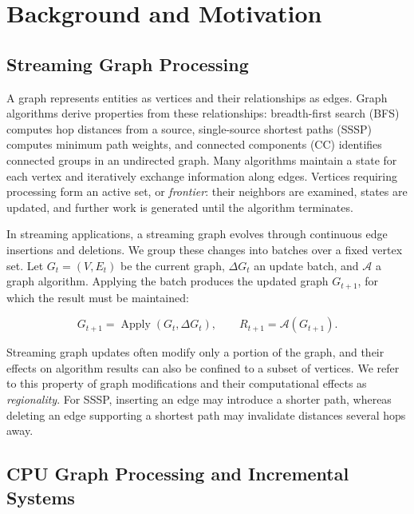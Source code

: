 \section{Background and Motivation}

\subsection{Streaming Graph Processing}

A graph represents entities as vertices and their relationships as edges. Graph algorithms derive properties from these relationships: breadth-first search (BFS) computes hop distances from a source, single-source shortest paths (SSSP) computes minimum path weights, and connected components (CC) identifies connected groups in an undirected graph. Many algorithms maintain a state for each vertex and iteratively exchange information along edges. Vertices requiring processing form an active set, or \emph{frontier}: their neighbors are examined, states are updated, and further work is generated until the algorithm terminates.

In streaming applications, a streaming graph evolves through continuous edge insertions and deletions. We group these changes into batches over a fixed vertex set. Let $G_t=(V,E_t)$ be the current graph, $\Delta G_t$ an update batch, and $\mathcal A$ a graph algorithm. Applying the batch produces the updated graph $G_{t+1}$, for which the result must be maintained:

\[
G_{t+1}=\operatorname{Apply}(G_t,\Delta G_t),
\qquad R_{t+1}=\mathcal A(G_{t+1}).
\]

Streaming graph updates often modify only a portion of the graph, and their effects on algorithm results can also be confined to a subset of vertices. We refer to this property of graph modifications and their computational effects as \emph{regionality}. For SSSP, inserting an edge may introduce a shorter path, whereas deleting an edge supporting a shortest path may invalidate distances several hops away.

\subsection{CPU Graph Processing and Incremental Systems}

